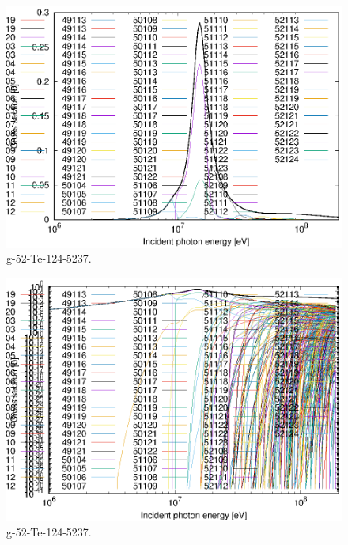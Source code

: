 \begin{figure}
 \includegraphics[width=\linewidth]{eps/g_52-Te-124_5237.eps}
  \caption{g-52-Te-124-5237.}
\end{figure}
\begin{figure}
 \includegraphics[width=\linewidth]{eps-log/g_52-Te-124_5237.eps}
 \caption{g-52-Te-124-5237.}
\end{figure}
\newpage \clearpage

